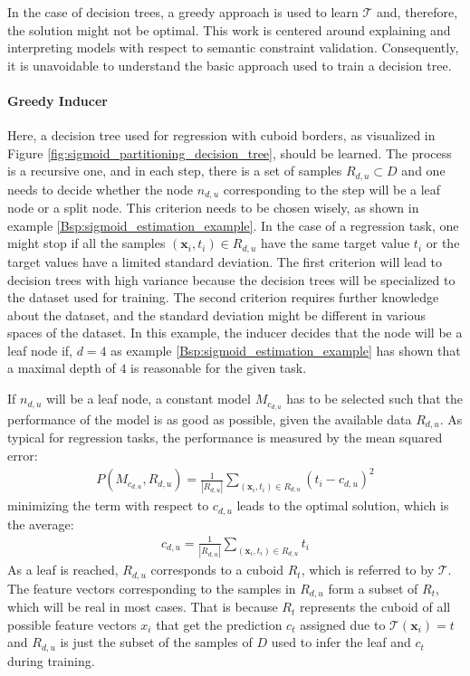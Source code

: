     In the case of decision trees, a greedy approach is used to learn $\mathcal{T}$ and, therefore, the solution might not be optimal. This work is centered around explaining and interpreting models with respect to semantic constraint validation. Consequently, it is unavoidable to understand the basic approach used to train a decision tree.

    \paragraph{Greedy Inducer} Here, a decision tree used for regression with cuboid borders, as visualized in Figure \ref{fig:sigmoid_partitioning_decision_tree}, should be learned. The process is a recursive one, and in each step, there is a set of samples $R_{d,u} \subset D$ and one needs to decide whether the node $n_{d,u}$ corresponding to the step will be a leaf node or a split node. This criterion needs to be chosen wisely, as shown in example \ref{Bsp:sigmoid_estimation_example}. In the case of a regression task, one might stop if all the samples $(\mathbf{x}_i,t_i) \in R_{d,u}$ have the same target value $t_i$ or the target values have a limited standard deviation. The first criterion will lead to decision trees with high variance because the decision trees will be specialized to the dataset used for training. The second criterion requires further knowledge about the dataset, and the standard deviation might be different in various spaces of the dataset. In this example, the inducer decides that the node will be a leaf node if, $d = 4$ as example \ref{Bsp:sigmoid_estimation_example} has shown that a maximal depth of $4$ is reasonable for the given task. 
    
    If $n_{d,u}$ will be a leaf node, a constant model $M_{c_{d,u}}$ has to be selected such that the performance of the model is as good as possible, given the available data $R_{d,u}$. As typical for regression tasks, the performance is measured by the mean squared error:
    \begin{gather}
        P(M_{c_{d,u}}, R_{d,u}) = \frac{1}{|R_{d,u}|} \sum_{(\mathbf{x}_i,t_i) \in R_{d,u}} (t_i - c_{d,u})^2 \label{mean_squared_error}
    \end{gather}
    minimizing the term with respect to $c_{d,u}$ leads to the optimal solution, which is the average:
    \begin{gather}
        c_{d,u} = \frac{1}{|R_{d,u}|} \sum_{(\mathbf{x}_i,t_i) \in R_{d,u}} t_i \label{optimal_predication_maximum_likelihood}
    \end{gather}
    As a leaf is reached, $R_{d,u}$ corresponds to a cuboid $R_t$, which is referred to by $\mathcal{T}$. The feature vectors corresponding to the samples in $R_{d,u}$ form a subset of $R_t$, which will be real in most cases. That is because $R_t$ represents the cuboid of all possible feature vectors $x_i$ that get the prediction $c_t$ assigned due to $\mathcal{T}(\mathbf{x}_i) = t$ and $R_{d,u}$ is just the subset of the samples of $D$ used to infer the leaf and $c_t$ during training.

